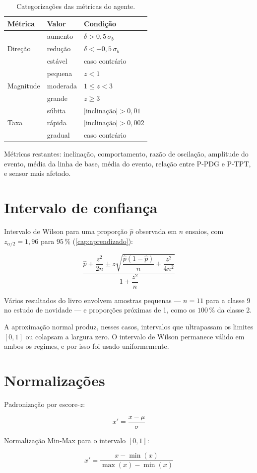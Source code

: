\begin{table}[htbp]
\centering
\caption{Categorizações das métricas do agente.}
\label{tab:for-categorias}
\small
\begin{tabular}{llp{6.2cm}}
\toprule
\textbf{Métrica} & \textbf{Valor} & \textbf{Condição} \\
\midrule
\multirow{3}{*}{Direção}
& aumento    & $\delta > 0{,}5\,\sigma_b$ \\
& redução    & $\delta < -0{,}5\,\sigma_b$ \\
& estável    & caso contrário \\
\midrule
\multirow{3}{*}{Magnitude}
& pequena    & $z < 1$ \\
& moderada   & $1 \le z < 3$ \\
& grande     & $z \ge 3$ \\
\midrule
\multirow{3}{*}{Taxa}
& súbita     & $|\text{inclinação}| > 0{,}01$ \\
& rápida     & $|\text{inclinação}| > 0{,}002$ \\
& gradual    & caso contrário \\
\bottomrule
\end{tabular}
\end{table}

Métricas restantes: inclinação, comportamento, razão de oscilação, amplitude do evento,
média da linha de base, média do evento, relação entre P-PDG e P-TPT, e sensor mais
afetado.

\section{Intervalo de confiança}

Intervalo de Wilson para uma proporção $\hat{p}$ observada em $n$ ensaios, com
$z_{\alpha/2} = 1{,}96$ para $95\,\%$ (\cref{cap:aprendizado}):

\begin{equation}
\frac{\hat{p} + \dfrac{z^2}{2n} \pm
z \sqrt{\dfrac{\hat{p}(1-\hat{p})}{n} + \dfrac{z^2}{4n^2}}}
{1 + \dfrac{z^2}{n}}
\label{eq:for-wilson}
\end{equation}

\begin{destaque}
Vários resultados do livro envolvem amostras pequenas --- $n = 11$ para a classe 9 no
estudo de novidade --- e proporções próximas de 1, como os $100\,\%$ da classe 2.

A aproximação normal produz, nesses casos, intervalos que ultrapassam os limites $[0,1]$
ou colapsam a largura zero. O intervalo de Wilson permanece válido em ambos os regimes, e
por isso foi usado uniformemente.
\end{destaque}

\section{Normalizações}

Padronização por escore-$z$:

\begin{equation}
x' = \frac{x - \mu}{\sigma}
\label{eq:for-zscore}
\end{equation}

Normalização Min-Max para o intervalo $[0,1]$:

\begin{equation}
x' = \frac{x - \min(x)}{\max(x) - \min(x)}
\label{eq:for-minmax}
\end{equation}
